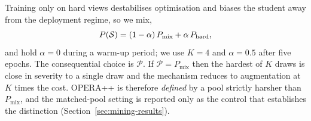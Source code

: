 Training only on hard views destabilises optimisation and biases the student away from the deployment regime, so
we mix,
\begin{equation}
P(\mathcal{S})=(1-\alpha)\,P_{\mathrm{mix}}+\alpha\,P_{\mathrm{hard}},
\label{eq:alpha}
\end{equation}
and hold $\alpha=0$ during a warm-up period; we use $K=4$ and $\alpha=0.5$ after five epochs. The consequential
choice is $\mathcal{P}$. If $\mathcal{P}=P_{\mathrm{mix}}$ then the hardest of $K$ draws is close in severity to a
single draw and the mechanism reduces to augmentation at $K$ times the cost. OPERA++ is therefore \emph{defined}
by a pool strictly harsher than $P_{\mathrm{mix}}$, and the matched-pool setting is reported only as the control
that establishes the distinction (Section~\ref{sec:mining-results}).
